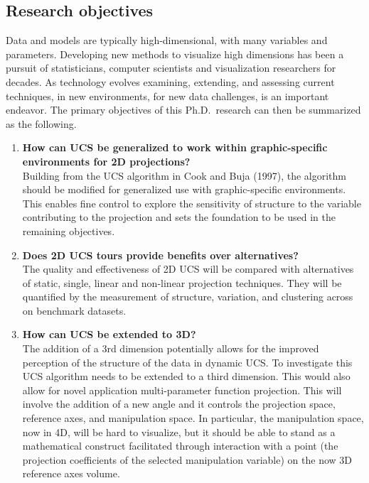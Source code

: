\documentclass[11,]{article}
\begin{document}
\hypertarget{research-objectives}{%
\subsection{Research objectives}\label{research-objectives}}

Data and models are typically high-dimensional, with many variables and parameters. Developing new methods to visualize high dimensions has been a pursuit of statisticians, computer scientists and visualization researchers for decades. As technology evolves examining, extending, and assessing current techniques, in new environments, for new data challenges, is an important endeavor. The primary objectives of this Ph.D.~research can then be summarized as the following.

\begin{enumerate}
\def\labelenumi{\arabic{enumi}.}
\item
  \textbf{How can UCS be generalized to work within graphic-specific environments for 2D projections?}\\
  Building from the UCS algorithm in Cook and Buja (1997), the algorithm should be modified for generalized use with graphic-specific environments. This enables fine control to explore the sensitivity of structure to the variable contributing to the projection and sets the foundation to be used in the remaining objectives.
\item
  \textbf{Does 2D UCS tours provide benefits over alternatives?}\\
  The quality and effectiveness of 2D UCS will be compared with alternatives of static, single, linear and non-linear projection techniques. They will be quantified by the measurement of structure, variation, and clustering across on benchmark datasets.
\item
  \textbf{How can UCS be extended to 3D?}\\
  The addition of a 3rd dimension potentially allows for the improved perception of the structure of the data in dynamic UCS. To investigate this UCS algorithm needs to be extended to a third dimension. This would also allow for novel application multi-parameter function projection. This will involve the addition of a new angle and it controls the projection space, reference axes, and manipulation space. In particular, the manipulation space, now in 4D, will be hard to visualize, but it should be able to stand as a mathematical construct facilitated through interaction with a point (the projection coefficients of the selected manipulation variable) on the now 3D reference axes volume.
\end{enumerate}
\end{document}
